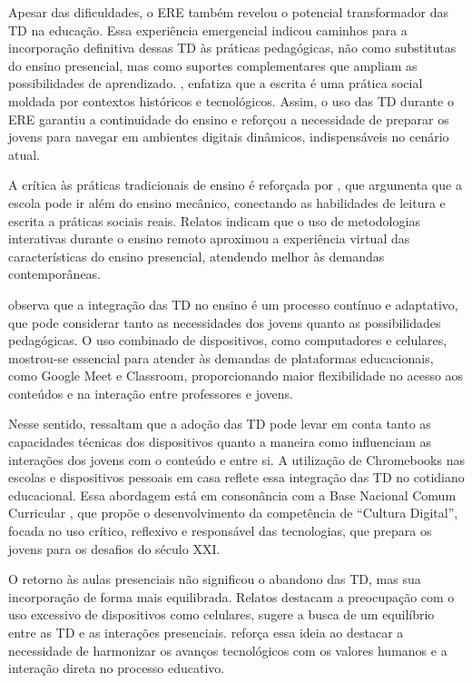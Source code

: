 \documentclass[portuguese]{textolivre}
\begin{document}
Apesar das dificuldades, o ERE também revelou o potencial transformador das TD na educação. Essa experiência emergencial indicou caminhos para a incorporação definitiva dessas TD às práticas pedagógicas, não como substitutas do ensino presencial, mas como suportes complementares que ampliam as possibilidades de aprendizado. \textcite[p. 104)]{ribeiro2018},  enfatiza que a escrita é uma prática social moldada por contextos históricos e tecnológicos. Assim, o uso das TD durante o ERE garantiu a continuidade do ensino e reforçou a necessidade de preparar os jovens para navegar em ambientes digitais dinâmicos, indispensáveis no cenário atual.

A crítica às práticas tradicionais de ensino é reforçada por \textcite[p. 37]{soares2002}, que argumenta que a escola pode ir além do ensino mecânico, conectando as habilidades de leitura e escrita a práticas sociais reais. Relatos indicam que o uso de metodologias interativas durante o ensino remoto aproximou a experiência virtual das características do ensino presencial, atendendo melhor às demandas contemporâneas.

\textcite[p. 78]{ribeiro2016} observa que a integração das TD no ensino é um processo contínuo e adaptativo, que pode considerar tanto as necessidades dos jovens quanto as possibilidades pedagógicas. O uso combinado de dispositivos, como computadores e celulares, mostrou-se essencial para atender às demandas de plataformas educacionais, como Google Meet e Classroom, proporcionando maior flexibilidade no acesso aos conteúdos e na interação entre professores e jovens.

Nesse sentido, \textcite[p. 45]{barton2015} ressaltam que a adoção das TD pode levar em conta tanto as capacidades técnicas dos dispositivos quanto a maneira como influenciam as interações dos jovens com o conteúdo e entre si. A utilização de Chromebooks nas escolas e dispositivos pessoais em casa reflete essa integração das TD no cotidiano educacional. Essa abordagem está em consonância com a Base Nacional Comum Curricular \cite{brasil2018}, que propõe o desenvolvimento da competência de “Cultura Digital”, focada no uso crítico, reflexivo e responsável das tecnologias, que prepara os jovens para os desafios do século XXI.

O retorno às aulas presenciais não significou o abandono das TD, mas sua incorporação de forma mais equilibrada. Relatos destacam a preocupação com o uso excessivo de dispositivos como celulares, sugere a busca de um equilíbrio entre as TD e as interações presenciais. \textcite[p. 63]{moran2001} reforça essa ideia ao destacar a necessidade de harmonizar os avanços tecnológicos com os valores humanos e a interação direta no processo educativo.
\end{document}
